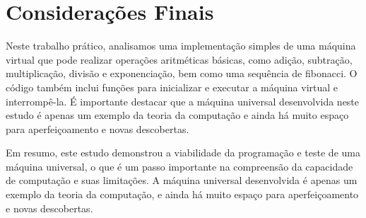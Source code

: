 \documentclass{article}
\begin{document}
\clearpage
\section{Considerações Finais}
\DESCRICAO{}

Neste trabalho prático, analisamos uma implementação simples de uma máquina virtual que pode realizar operações aritméticas básicas, como adição, subtração, multiplicação, divisão e exponenciação, bem como uma sequência de fibonacci. O código também inclui funções para inicializar e executar a máquina virtual e interrompê-la. É importante destacar que a máquina universal desenvolvida neste estudo é apenas um exemplo da teoria da computação e ainda há muito espaço para aperfeiçoamento e novas descobertas.

Em resumo, este estudo demonstrou a viabilidade da programação e teste de uma máquina universal, o que é um passo importante na compreensão da capacidade de computação e suas limitações. A máquina universal desenvolvida é apenas um exemplo da teoria da computação, e ainda há muito espaço para aperfeiçoamento e novas descobertas.

\clearpage
\end{document}
